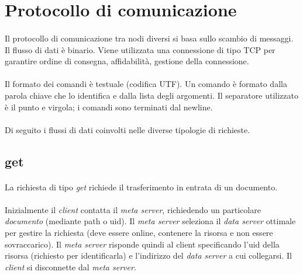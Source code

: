 \documentclass[11pt,a4paper,english]{article}
\begin{document}
\section{Protocollo di comunicazione}

\paragraph{} Il protocollo di comunicazione\cite{comproto} tra nodi diversi si basa sullo scambio di messaggi. Il flusso di dati è binario. Viene utilizzata una connessione di tipo TCP per garantire ordine di consegna, affidabilità, gestione della connessione. 

\paragraph{} Il formato dei comandi è testuale (codifica UTF). Un comando è formato dalla parola chiave che lo identifica e dalla lista degli argomenti. Il separatore utilizzato è il punto e virgola; i comandi sono terminati dal newline.

\paragraph{} Di seguito i flussi di dati coinvolti nelle diverse tipologie di richieste.

\subsection{get}

\paragraph{} La richiesta di tipo \emph{get} richiede il trasferimento in entrata di un documento. 

\paragraph{} Inizialmente il \emph{client} contatta il \emph{meta server}, richiedendo un particolare \emph{documento} (mediante path o uid). Il \emph{meta server} seleziona il \emph{data server} ottimale per gestire la richiesta (deve essere online, contenere la risorsa e non essere sovraccarico). Il \emph{meta server} risponde quindi al client specificando l'uid della risorsa (richiesto per identificarla) e l'indirizzo del \emph{data server} a cui collegarsi. Il \emph{client} si disconnette dal \emph{meta server}.
\end{document}
